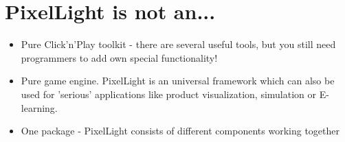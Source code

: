 \section{PixelLight is not an...}
\begin{itemize}
\item{Pure Click'n'Play toolkit - there are several useful tools, but you still need programmers to add own special functionality!}
\item{Pure game engine. PixelLight is an universal framework which can also be used for 'serious' applications like product visualization, simulation or E-learning.}
\item{One package - PixelLight consists of different components working together}
\end{itemize}





